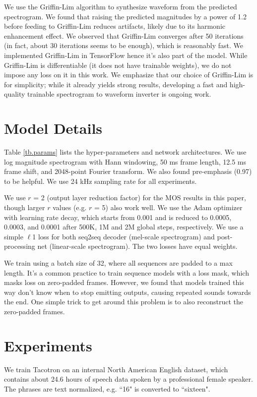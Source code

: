 \documentclass{article} \usepackage{iclr2017_conference,times}
\begin{document}
We use the Griffin-Lim algorithm \citep{griffin1984signal} to synthesize waveform from the predicted spectrogram. We found that raising the predicted magnitudes by a power of 1.2 before feeding to Griffin-Lim reduces artifacts, likely due to its harmonic enhancement effect. We observed that Griffin-Lim converges after 50 iterations (in fact, about 30 iterations seems to be enough), which is reasonably fast. We implemented Griffin-Lim in TensorFlow \citep{abadi2016tensorflow} hence it's also part of the model. While Griffin-Lim is differentiable (it does not have trainable weights), we do not impose any loss on it in this work. We emphasize that our choice of Griffin-Lim is for simplicity; while it already yields strong results, developing a fast and high-quality trainable spectrogram to waveform inverter is ongoing work. 

\section{Model Details}
Table \ref{tb.params} lists the hyper-parameters and network architectures. We use log magnitude spectrogram with Hann windowing, 50 ms frame length, 12.5 ms frame shift, and 2048-point Fourier transform. We also found pre-emphasis (0.97) to be helpful. We use 24 kHz sampling rate for all experiments.

We use $r$ = 2 (output layer reduction factor) for the MOS results in this paper, though larger $r$ values (e.g. $r$ = 5) also work well. We use the Adam optimizer \citep{kingma2015adam} with learning rate decay, which starts from 0.001 and is reduced to 0.0005, 0.0003, and 0.0001 after 500K, 1M and 2M global steps, respectively. We use a simple $\ell$1 loss for both seq2seq decoder (mel-scale spectrogram) and post-processing net (linear-scale spectrogram). The two losses have equal weights.

We train using a batch size of 32, where all sequences are padded to a max length. It's a common practice to train sequence models with a loss mask, which masks loss on zero-padded frames. However, we found that models trained this way don't know when to stop emitting outputs, causing repeated sounds towards the end. One simple trick to get around this problem is to also reconstruct the zero-padded frames.

\section{Experiments}
We train Tacotron on an internal North American English dataset, which contains about 24.6 hours of speech data spoken by a professional female speaker. The phrases are text normalized, e.g. ``16" is converted to ``sixteen".
\end{document}
